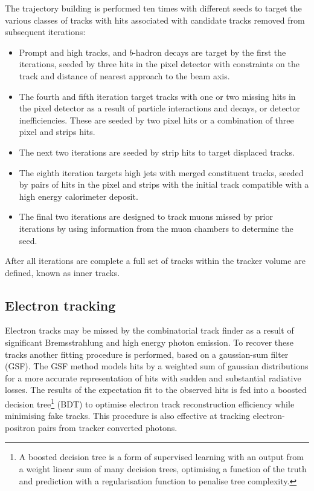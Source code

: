 The trajectory building is performed ten times with different seeds to target
the various classes of tracks with hits associated with candidate tracks
removed from subsequent iterations:
\begin{itemize}
    \item Prompt and high \pt tracks, and $b$-hadron decays are target by the
    first the iterations, seeded by three hits in the pixel detector with
    constraints on the track \pt and distance of nearest approach to the beam axis.
    \item The fourth and fifth iteration target tracks with one or two missing
    hits in the pixel detector as a result of particle interactions and
    decays, or detector inefficiencies. These are seeded by two pixel hits or
    a combination of three pixel and strips hits.
    \item The next two iterations are seeded by strip hits to target displaced tracks.
    \item The eighth iteration targets high \pt jets with merged constituent
    tracks, seeded by pairs of hits in the pixel and strips with the initial
    track compatible with a high energy calorimeter deposit.
    \item The final two iterations are designed to track muons missed by prior
    iterations by using information from the muon chambers to determine the seed.
\end{itemize}
After all iterations are complete a full set of tracks within the tracker
volume are defined, known as inner tracks.


\subsection{Electron tracking}

Electron tracks may be missed by the combinatorial track finder as a result of
significant Bremsstrahlung and high energy photon emission. To recover these
tracks another fitting procedure is performed, based on a gaussian-sum filter
(GSF). The GSF method models hits by a weighted sum of gaussian distributions
for a more accurate representation of hits with sudden and substantial
radiative losses. The results of the expectation fit to the observed hits is
fed into a boosted decision tree\footnote{A boosted decision tree is a form of
supervised learning with an output from a weight linear sum of many decision
trees, optimising a function of the truth and prediction with a regularisation
function to penalise tree complexity.} (BDT) to optimise electron track
reconstruction efficiency while minimising fake tracks. This procedure is also
effective at tracking electron-positron pairs from tracker converted photons.


